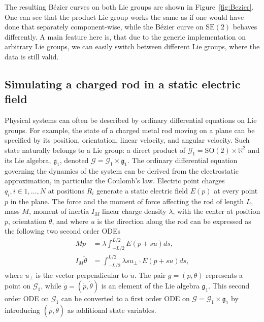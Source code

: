 \documentclass{juliacon}
\begin{document}
The resulting Bézier curves on both Lie groups are shown in Figure~\ref{fig:Bezier}.
One can see that the product Lie group works the same as if one would have done that
separately component-wise, while the Bézier curve on \(\mathrm{SE}(2)\) behaves differently.
A main feature here is, that due to the generic implementation on arbitrary Lie groups,
we can easily switch between different Lie groups, where the data is still valid.

\subsection{Simulating a charged rod in a static electric field}

Physical systems can often be described by ordinary differential equations on Lie groups.
For example, the state of a charged metal rod moving on a plane can be specified by its position, orientation, linear velocity, and angular velocity.
Such state naturally belongs to a Lie group: a direct product of \(\mathcal G_1 = \mathrm{SO}(2) \times \mathbb{R}^2\) and its Lie algebra, \(\mathfrak{g}_1\), denoted \(\mathcal G = \mathcal G_1 \times \mathfrak{g}_1\).
The ordinary differential equation governing the dynamics of the system can be derived from the electrostatic approximation, in particular the Coulomb's law.
Electric point charges \(q_i, i \in {1, \dots, N}\) at positions \(R_i\) generate a static electric field \(E(p)\) at every point \(p\) in the plane.
The force and the moment of force affecting the rod of length \(L\), mass \(M\), moment of inertia \(I_M\) linear charge density \(\lambda\), with the center at position \(p\), orientation \(\theta\), and where \(u\) is the direction along the rod can be expressed as the following two second order ODEs
\begin{align*}
    M\ddot{p} &= \lambda \int_{-L/2}^{L/2} E(p + su) ds,  \\
    I_M \ddot{\theta} &= \int_{-L/2}^{L/2} \lambda s u_{\perp} \cdot E(p + su) ds,
\end{align*}
where \(u_{\perp}\) is the vector perpendicular to \(u\). The pair \(g=(p, \theta)\) represents a point on \(\mathcal G_1\), while \(\dot g = (\dot{p}, \dot{\theta})\) is an element of the Lie algebra \(\mathfrak{g}_1\).
This second order ODE on \(\mathcal G_1\) can be converted to a first order ODE on \(\mathcal G = \mathcal G_1 \times \mathfrak{g}_1\) by introducing \((\dot{p}, \dot{\theta})\) as additional state variables.
\end{document}
